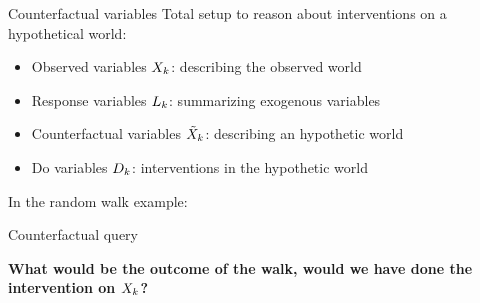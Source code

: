 \documentclass{beamer}
\begin{document}
    \begin{frame}{Counterfactual variables}
        Total setup to reason about interventions on a hypothetical world:
        \begin{itemize}
            \item Observed variables $X_{k}$: describing the observed world
            \item Response variables $L_{k}$: summarizing exogenous variables
            \item Counterfactual variables $\tilde{X}_{k}$: describing an hypothetic world
            \item Do variables $D_{k}$: interventions in the hypothetic world
        \end{itemize}

            In the random walk example:
        \vspace{-0.5cm}
        

    \end{frame}




    \begin{frame}{Counterfactual query}

        \begin{center}
            \bf What would be the outcome of the walk, would we have done the intervention on $X_{k}$?
        \end{center}

        


    \end{frame}
\end{document}
